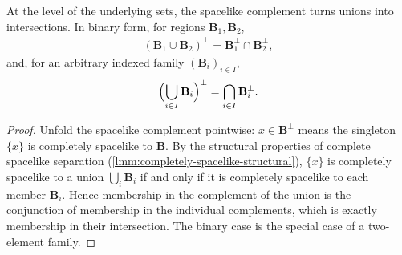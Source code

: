 \begin{lemma}
    \label{lmm:spacelike-complement-de-morgan}
    \leanok
    At the level of the underlying sets, the spacelike complement turns unions into intersections. In binary form, for regions $\mathbf{B}_1, \mathbf{B}_2$,
    \begin{align}
        (\mathbf{B}_1 \cup \mathbf{B}_2)^\perp = \mathbf{B}_1^\perp \cap \mathbf{B}_2^\perp,
    \end{align}
    and, for an arbitrary indexed family $(\mathbf{B}_i)_{i \in I}$,
    \begin{align}
        \Bigl(\bigcup_{i \in I} \mathbf{B}_i\Bigr)^\perp = \bigcap_{i \in I} \mathbf{B}_i^\perp.
    \end{align}
\end{lemma}
\begin{proof}
    \leanok
    Unfold the spacelike complement pointwise: $x \in \mathbf{B}^\perp$ means the singleton $\{x\}$ is completely spacelike to $\mathbf{B}$. By the structural properties of complete spacelike separation (\ref{lmm:completely-spacelike-structural}), $\{x\}$ is completely spacelike to a union $\bigcup_i \mathbf{B}_i$ if and only if it is completely spacelike to each member $\mathbf{B}_i$. Hence membership in the complement of the union is the conjunction of membership in the individual complements, which is exactly membership in their intersection. The binary case is the special case of a two-element family.
\end{proof}


